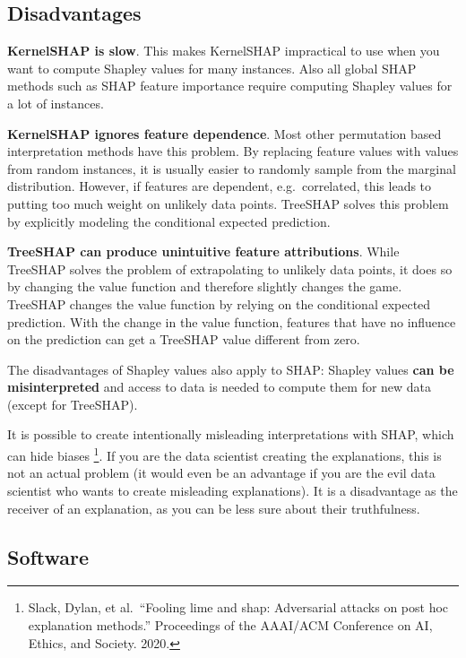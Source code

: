 \documentclass[
  12pt,
]{krantz}
\begin{document}
\hypertarget{disadvantages-17}{%
\subsection{Disadvantages}\label{disadvantages-17}}

\textbf{KernelSHAP is slow}.
This makes KernelSHAP impractical to use when you want to compute Shapley values for many instances.
Also all global SHAP methods such as SHAP feature importance require computing Shapley values for a lot of instances.

\textbf{KernelSHAP ignores feature dependence}.
Most other permutation based interpretation methods have this problem.
By replacing feature values with values from random instances, it is usually easier to randomly sample from the marginal distribution.
However, if features are dependent, e.g.~correlated, this leads to putting too much weight on unlikely data points.
TreeSHAP solves this problem by explicitly modeling the conditional expected prediction.

\textbf{TreeSHAP can produce unintuitive feature attributions}.
While TreeSHAP solves the problem of extrapolating to unlikely data points, it does so by changing the value function and therefore slightly changes the game.
TreeSHAP changes the value function by relying on the conditional expected prediction.
With the change in the value function, features that have no influence on the prediction can get a TreeSHAP value different from zero.

The disadvantages of Shapley values also apply to SHAP:
Shapley values \textbf{can be misinterpreted} and access to data is needed to compute them for new data (except for TreeSHAP).

It is possible to create intentionally misleading interpretations with SHAP, which can hide biases \footnote{Slack, Dylan, et al.~``Fooling lime and shap: Adversarial attacks on post hoc explanation methods.'' Proceedings of the AAAI/ACM Conference on AI, Ethics, and Society. 2020.}.
If you are the data scientist creating the explanations, this is not an actual problem (it would even be an advantage if you are the evil data scientist who wants to create misleading explanations).
It is a disadvantage as the receiver of an explanation, as you can be less sure about their truthfulness.

\hypertarget{software-4}{%
\subsection{Software}\label{software-4}}
\end{document}
